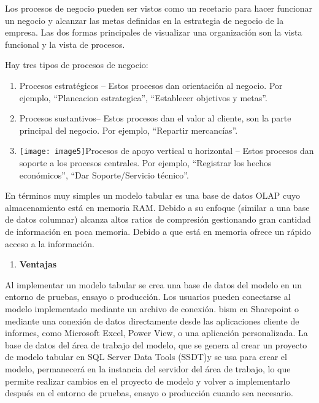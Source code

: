 \noindent 

\noindent Los procesos de negocio pueden ser vistos como un recetario para hacer funcionar un negocio y alcanzar las metas definidas en la estrategia de negocio de la empresa. Las dos formas principales de visualizar una organizaci\'{o}n son la vista funcional y la vista de procesos.

\noindent 

\noindent Hay tres tipos de procesos de negocio:

\noindent 

\begin{enumerate}
\item  Procesos estrat\'{e}gicos -- Estos procesos dan orientaci\'{o}n al negocio. Por ejemplo, ``Planeacion estrategica'', ``Establecer objetivos y metas''.

\item  Procesos sustantivos-- Estos procesos dan el valor al cliente, son la parte principal del negocio. Por ejemplo, ``Repartir mercanc\'{i}as''.

\item  \texttt{[image: image5]}Procesos de apoyo vertical u horizontal -- Estos procesos dan soporte a los procesos centrales. Por ejemplo, ``Registrar los hechos econ\'{o}micos'', ``Dar Soporte/Servicio t\'{e}cnico''.
\end{enumerate}

\noindent 
\noindent 
\noindent 



\noindent \textbf{}

\noindent \textbf{\underbar{}}

\noindent En t\'{e}rminos muy simples un modelo tabular es una base de datos OLAP cuyo almacenamiento est\'{a} en memoria RAM. Debido a su enfoque (similar a una base de datos columnar) alcanza altos ratios de compresi\'{o}n gestionando gran cantidad de informaci\'{o}n en poca memoria. Debido a que est\'{a} en memoria ofrece un r\'{a}pido acceso a la informaci\'{o}n.

\noindent 


\begin{enumerate}
\item  \textbf{Ventajas}
\end{enumerate}

\noindent Al implementar un modelo tabular se crea una base de datos del modelo en un entorno de pruebas, ensayo o producci\'{o}n. Los usuarios pueden conectarse al modelo implementado mediante un archivo de conexi\'{o}n. bism en Sharepoint o mediante una conexi\'{o}n de datos directamente desde las aplicaciones cliente de informes, como Microsoft Excel, Power View, o una aplicaci\'{o}n personalizada. La base de datos del \'{a}rea de trabajo del modelo, que se genera al crear un proyecto de modelo tabular en SQL Server Data Tools (SSDT)y se usa para crear el modelo, permanecer\'{a} en la instancia del servidor del \'{a}rea de trabajo, lo que permite realizar cambios en el proyecto de modelo y volver a implementarlo despu\'{e}s en el entorno de pruebas, ensayo o producci\'{o}n cuando sea necesario.

